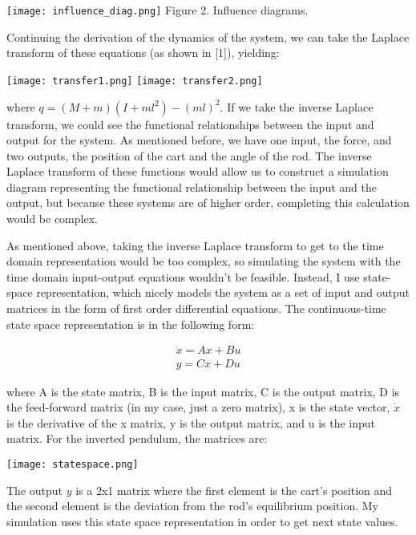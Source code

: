 \documentclass{article}
\begin{document}
\begin{center}
    \texttt{[image: influence\_diag.png]}
    Figure 2. Influence diagrams.
\end{center}

Continuing the derivation of the dynamics of the system, we can take the Laplace transform of these equations (as shown in [1]), yielding:

\begin{center}
    \texttt{[image: transfer1.png]}
    \texttt{[image: transfer2.png]}
    
\end{center}

where $q = (M + m)(I + ml^2) -(ml)^2$. If we take the inverse Laplace transform, we could see the functional relationships between the input and output for the system. As mentioned before, we have one input, the force, and two outputs, the position of the cart and the angle of the rod. The inverse Laplace transform of these functions would allow us to construct a simulation diagram representing the functional relationship between the input and the output, but because these systems are of higher order, completing this calculation would be complex. 


As mentioned above, taking the inverse Laplace transform to get to the time domain representation would be too complex, so simulating the system with the time domain input-output equations wouldn't be feasible. Instead, I use state-space representation, which nicely models the system as a set of input and output matrices in the form of first order differential equations. The continuous-time state space representation is in the following form:

\begin{align}
    \Dot{x} = Ax + Bu \\
    y = Cx + Du
\end{align}

\noindent where A is the state matrix, B is the input matrix, C is the output matrix, D is the feed-forward matrix (in my case, just a zero matrix), x is the state vector, $\Dot{x}$ is the derivative of the x matrix, y is the output matrix, and u is the input matrix. For the inverted pendulum, the matrices are: 

\begin{center}
    \texttt{[image: statespace.png]}
\end{center}

The output $y$ is a 2x1 matrix where the first element is the cart's position and the second element is the deviation from the rod's equilibrium position. My simulation uses this state space representation in order to get next state values. 
\end{document}
